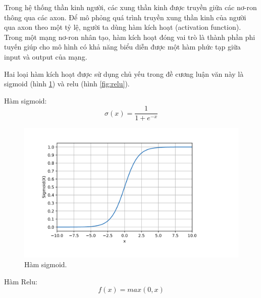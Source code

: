 \begin{itemize}
          Trong hệ thống thần kinh người, các xung thần kinh được truyền giữa các nơ-ron thông qua các axon. Để  mô phỏng quá trình truyền xung thần kinh của người qua axon theo một tỷ lệ, người ta dùng hàm kích hoạt (activation function). Trong một mạng nơ-ron nhân tạo, hàm kích hoạt đóng vai trò là thành phần phi tuyến giúp cho mô hình có khả năng biểu diễn được một hàm phức tạp giữa input và output của mạng.

          Hai loại hàm kích hoạt được sử dụng chủ yếu trong đề cương luận văn này là sigmoid (hình \ref{fig:sigmoid}) và relu (hình \ref{fig:relu}).
          
          Hàm sigmoid:
          \begin{equation}
              \sigma(x) = \frac{1}{1+e^{-x}}
          \end{equation}

          \begin{figure}[t]
              \begin{center}
                  \includegraphics[scale=0.2]{asset/image/sigmoid.png}
                  \caption{Hàm sigmoid. }
                  \label{fig:sigmoid}
              \end{center}
          \end{figure}


          Hàm Relu:
          \begin{equation}
              f(x) = max(0,x)
          \end{equation}


\end{itemize}

